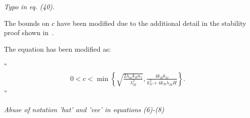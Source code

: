 \documentclass[11pt]{article}
\newcommand{\braces}[1]{\ensuremath{\left\{ #1 \right\}}}
\newenvironment{correction}{\begin{list}{}{\setlength{\leftmargin}{1cm}\setlength{\rightmargin}{1cm}}\vspace{\parsep}\item[]``}{''\end{list}}
\begin{document}
\begin{enumerate}
%


\item \textit{Typo in eq. (40).}

The bounds on \( c \) have been modified due to the additional detail in the stability proof shown in~.

The equation has been modified as:
\begin{correction}
\begin{gather*}
	0 < c < \min \braces{\sqrt{\frac{2 \lambda_m k_R n_1}{\lambda_M^2}},
	\frac{4 k_R k_\Omega}{k_\Omega^2 + 4 k_R \lambda_M H}}. %
\end{gather*}
\end{correction}

\item \textit{Abuse of notation 'hat' and 'vee' in equations (6)-(8)}


\end{enumerate}
\end{document}
